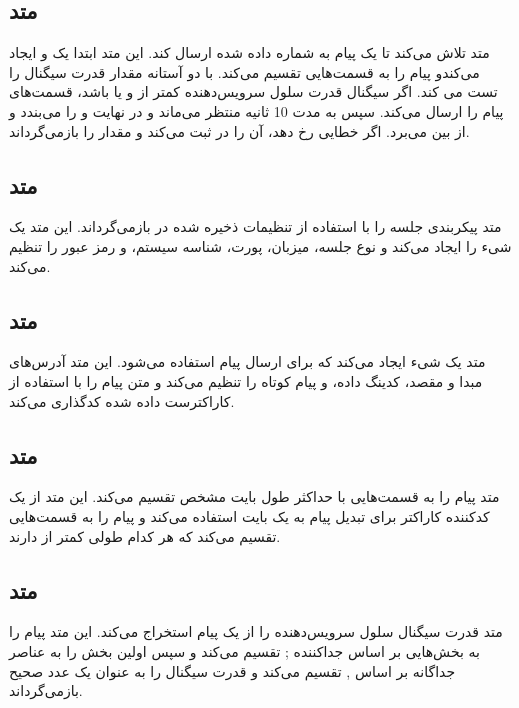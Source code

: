 \documentclass{report}
\begin{document}
\subsection{متد
}
متد
 تلاش می‌کند تا یک پیام 
  به شماره داده شده ارسال کند. این متد ابتدا یک
   و 
   ایجاد می‌کندو پیام را به قسمت‌هایی تقسیم می‌کند. با دو آستانه مقدار قدرت سیگنال را تست می کند. اگر سیگنال قدرت سلول سرویس‌دهنده کمتر از 
   و یا
    باشد، قسمت‌های پیام را ارسال می‌کند. سپس به مدت 
    10 
    ثانیه منتظر می‌ماند و در نهایت 
    و 
    را می‌بندد و از بین می‌برد. اگر خطایی رخ دهد، آن را در 
     ثبت می‌کند و مقدار 
     را بازمی‌گرداند.

\subsection{متد
}
متد 
پیکربندی جلسه 
را با استفاده از تنظیمات ذخیره شده در
 بازمی‌گرداند. این متد یک شیء 
 را ایجاد می‌کند و نوع جلسه، میزبان، پورت، شناسه سیستم، و رمز عبور را تنظیم می‌کند.
 
 \subsection{متد
 }
متد
  یک شیء 
  ایجاد می‌کند که برای ارسال پیام
    استفاده می‌شود. این متد آدرس‌های مبدا و مقصد، کدینگ داده، و پیام کوتاه را تنظیم می‌کند و متن پیام را با استفاده از کاراکترست داده شده کدگذاری می‌کند.
\subsection{متد
}
متد
 پیام را به قسمت‌هایی با حداکثر طول بایت مشخص تقسیم می‌کند. این متد از یک کدکننده کاراکتر برای تبدیل پیام به یک
  بایت استفاده می‌کند و پیام را به قسمت‌هایی تقسیم می‌کند که هر کدام طولی کمتر از 
 دارند.
\subsection{متد
}
متد 
قدرت سیگنال سلول سرویس‌دهنده را از یک پیام استخراج می‌کند. این متد پیام را به بخش‌هایی بر اساس جداکننده ; تقسیم می‌کند و سپس اولین بخش را به عناصر جداگانه بر اساس , تقسیم می‌کند و قدرت سیگنال را به عنوان یک عدد صحیح بازمی‌گرداند.
\end{document}
